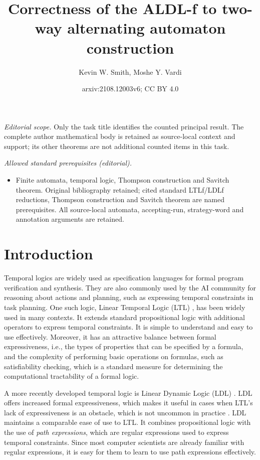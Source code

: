 \documentclass[10pt,a4paper]{amsart}
\title{Correctness of the ALDL-f to two-way alternating automaton construction}
\author{Kevin W. Smith, Moshe Y. Vardi}
\date{arxiv:2108.12003v6; CC BY 4.0}
\theoremstyle{plain}
\theoremstyle{definition}
\theoremstyle{definition}
\DeclareMathOperator{\?}{?}
\begin{document}
\maketitle
\noindent\textit{Editorial scope.} Only the task title identifies the counted principal result. The complete author mathematical body is retained as source-local context and support; its other theorems are not additional counted items in this task.\par\medskip
\noindent\textit{Allowed standard prerequisites (editorial).}\begin{itemize}
\item Finite automata, temporal logic, Thompson construction and Savitch theorem. Original bibliography retained; cited standard LTLf/LDLf reductions, Thompson construction and Savitch theorem are named prerequisites. All source-local automata, accepting-run, strategy-word and annotation arguments are retained.
\end{itemize}\medskip
\section{Introduction}
\label{ch:introduction}

Temporal logics are widely used as specification languages for formal program verification and synthesis. They are also commonly used by the AI community for reasoning about actions and planning, such as expressing temporal constraints in task planning. One such logic, Linear Temporal Logic (LTL) \cite{pnueli77}, has been widely used in many contexts. It extends standard propositional logic with additional operators to express temporal constraints. It is simple to understand and easy to use effectively. Moreover, it has an attractive balance between formal expressiveness, i.e., the types of properties that can be specified by a formula, and the complexity of performing basic operations on formulas, such as satisfiability checking, which is a standard measure for determining the computational tractability of a formal logic.

A more recently developed temporal logic is Linear Dynamic Logic (LDL) \cite{ldlf}. LDL offers increased formal expressiveness, which makes it useful in cases when LTL's lack of expressiveness is an obstacle, which is not uncommon in practice \cite{ldlf}. LDL maintains a comparable ease of use to LTL. It combines propositional logic with the use of \textit{path expressions}, which are regular expressions used to express temporal constraints. Since most computer scientists are already familiar with regular expressions, it is easy for them to learn to use path expressions effectively.
\end{document}
